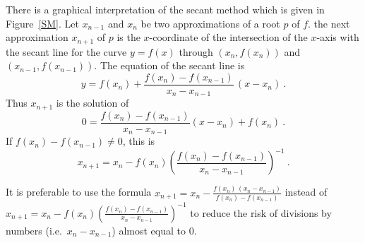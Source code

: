 There is a graphical interpretation of the secant method which is
given in Figure~\ref{SM}.  Let $x_{n-1}$ and $x_n$ be two
approximations of a root $p$ of $f$. the next approximation $x_{n+1}$
of $p$ is the $x$-coordinate of the intersection of the $x$-axis with
the secant line for the curve $y=f(x)$ through $(x_n,f(x_n))$ and
$(x_{n-1},f(x_{n-1}))$.  The equation of the secant line is
\[
y= f(x_n) + \frac{f(x_n)-f(x_{n-1})}{x_n-x_{n-1}}\,(x-x_n) \ .
\]
Thus $x_{n+1}$ is the solution of
\[
0= \frac{f(x_n)-f(x_{n-1})}{x_n-x_{n-1}}  (x-x_n) +f(x_n) \ .
\]
If $f(x_n) - f(x_{n-1}) \neq 0$, this is
\[
x_{n+1} = x_n - f(x_n) \left(\frac{f(x_n)-f(x_{n-1})}{x_n-x_{n-1}}\right)^{-1}
\ .
\]


\begin{rmk}
It is preferable to use the formula
$\displaystyle x_{n+1} = x_n -
\frac{f(x_n)\,(x_n-x_{n-1})}{f(x_n)-f(x_{n-1})}$ instead of
$\displaystyle x_{n+1} =
x_n - f(x_n) \left(\frac{f(x_n)-f(x_{n-1})}{x_n-x_{n-1}}\right)^{-1}$
to reduce the risk of divisions by numbers (i.e.\ $x_n-x_{n-1}$) almost
equal to $0$.
\end{rmk}

